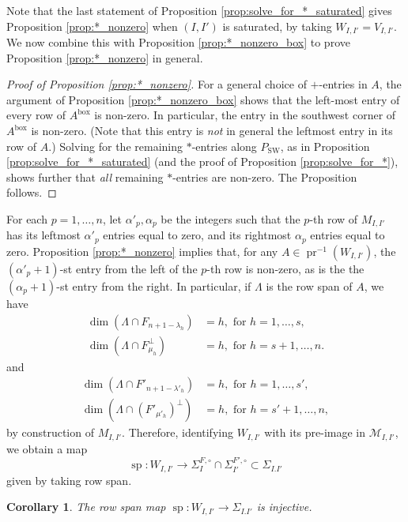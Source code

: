 \documentclass[12pt]{amsart}
\newtheorem{corollary}[definition]{Corollary}
\DeclareMathOperator{\inbox}{box}
\DeclareMathOperator{\pr}{pr}
\DeclareMathOperator{\ssp}{sp}
\DeclareMathOperator{\SW}{SW}
\newcommand{\cM}{\mathcal{M}}
\begin{document}
Note that the last statement of Proposition \ref{prop:solve_for_*_saturated} gives Proposition \ref{prop:*_nonzero} when $(I,I')$ is saturated, by taking $W_{I,I'}=V_{I,I'}$. We now combine this with Proposition \ref{prop:*_nonzero_box} to prove Proposition \ref{prop:*_nonzero} in general.

\begin{proof}[Proof of Proposition \ref{prop:*_nonzero}]
    For a general choice of $+$-entries in $A$, the argument of Proposition \ref{prop:*_nonzero_box} shows that the left-most entry of every row of $A^{\inbox}$ is non-zero. In particular, the entry in the southwest corner of $A^{\inbox}$ is non-zero. (Note that this entry is \emph{not} in general the leftmost entry in its row of $A$.) Solving for the remaining $*$-entries along $P_{\SW}$, as in Proposition \ref{prop:solve_for_*_saturated} (and the proof of Proposition \ref{prop:solve_for_*}), shows further that \emph{all} remaining $*$-entries are non-zero. The Proposition follows.
\end{proof}

For each $p=1,\ldots,n$, let $\alpha'_p,\alpha_p$ be the integers such that the $p$-th row of $M_{I,I'}$ has its leftmost $\alpha'_p$ entries equal to zero, and its rightmost $\alpha_p$ entries equal to zero. Proposition \ref{prop:*_nonzero} implies that, for any $A\in\pr^{-1}(W_{I,I'})$, the $(\alpha'_p+1)$-st entry from the left of the $p$-th row is non-zero, as is the the $(\alpha_p+1)$-st entry from the right. In particular, if $\Lambda$ is the row span of $A$, we have
\begin{align*}
    \dim(\Lambda\cap F_{n+1-\lambda_h})&=h,\text{ for }h=1,\ldots,s,\\
    \dim(\Lambda\cap F^\perp_{\mu_h})&=h,\text{ for }h=s+1,\ldots,n.
\end{align*}
and 
\begin{align*}
    \dim(\Lambda\cap F'_{n+1-\lambda'_h})&=h,\text{ for }h=1,\ldots,s',\\
    \dim(\Lambda\cap (F'_{\mu'_h})^\perp)&=h,\text{ for }h=s'+1,\ldots,n,
\end{align*}
by construction of $M_{I,I'}$. Therefore, identifying $W_{I,I'}$ with its pre-image in $\cM_{I,I'}$, we obtain a map
\begin{equation*}
\ssp: W_{I,I'}\to \Sigma^{F,\circ}_I \cap \Sigma^{F',\circ}_{I'} \subset \Sigma_{I.I'}
\end{equation*}
given by taking row span.

\begin{corollary}\label{cor:matrix_injective}
The row span map $\ssp: W_{I,I'}\to \Sigma_{I.I'}$ is injective.
\end{corollary}
\end{document}
